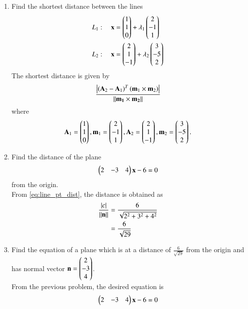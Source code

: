\begin{enumerate}[label=\arabic*.,ref=\thesubsection.\theenumi]
\item Find the shortest distance between the lines 
\begin{align}
L_1: \quad \mathbf{x} &= \begin{pmatrix}1\\1\\0\end{pmatrix} + \lambda_1\begin{pmatrix}2 \\ -1 \\1\end{pmatrix}
\\
L_2: \quad \mathbf{x} &= \begin{pmatrix}2\\1\\-1\end{pmatrix} + \lambda_2\begin{pmatrix}3 \\ -5 \\2\end{pmatrix}
\end{align}
\label{prob:line_dist_skew}
\solution  The shortest distance is given by 
%
\begin{align}
\label{eq:line_dist_skew}
\frac{\left\vert\left(\mathbf{A}_2-\mathbf{A}_1\right)^T\left(\mathbf{m}_1\times\mathbf{m}_2\right)\right\vert}{\left\lVert\mathbf{\mathbf{m}_1\times\mathbf{m}_2}\right\rVert}
\end{align}
%
where
\begin{align}
\mathbf{A}_1= \begin{pmatrix}1\\1\\0\end{pmatrix}, \mathbf{m}_1=\begin{pmatrix}2 \\ -1 \\1\end{pmatrix},
\mathbf{A}_2= \begin{pmatrix}2\\1\\-1\end{pmatrix}, \mathbf{m}_2 =\begin{pmatrix}3 \\ -5 \\2\end{pmatrix}.
\end{align}
%
\item Find the distance of the plane 
\begin{align}
\begin{pmatrix}2 & -3 & 4\end{pmatrix}\mathbf{x}-6  = 0
\end{align}
%
from the origin.
\\
\solution From \eqref{eq:line_pt_dist}, the distance is obtained as
%
\begin{align}
\frac{\left\vert c\right\vert}{\left\lVert\mathbf{n}\right\rVert} &= \frac{6}{\sqrt{2^2+3^2+4^2}}
\\
&= \frac{6}{\sqrt{29}}
\end{align}
%

\item Find the equation of a plane which is at a distance of $\frac{6}{\sqrt{29}}$ from the origin and has  normal vector $\mathbf{n}=\begin{pmatrix}2\\-3\\4\end{pmatrix}$.
%
\\
\solution From the previous problem, the desired equation is
%
\begin{align}
\begin{pmatrix}2 & -3 & 4\end{pmatrix}\mathbf{x}-6  = 0
\end{align}
%


\end{enumerate}
